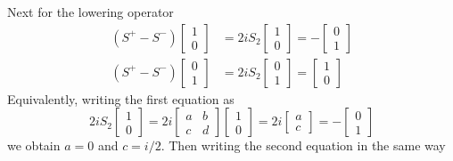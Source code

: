 \documentclass[../../../main.tex]{subfiles}
\begin{document}
Next for the lowering operator
\begin{align*}
    (S^+ - S^-) \begin{bmatrix}1 \\ 0 \end{bmatrix} & =  2i S_2 \begin{bmatrix}1 \\ 0 \end{bmatrix} = - \begin{bmatrix}0 \\ 1 \end{bmatrix} \\
    (S^+ - S^-) \begin{bmatrix}0 \\ 1 \end{bmatrix} & =  2i S_2 \begin{bmatrix}0 \\ 1 \end{bmatrix} = \begin{bmatrix}1 \\ 0 \end{bmatrix}
\end{align*}
Equivalently, writing the first equation as
\begin{equation*}
    2iS_2 \begin{bmatrix}
        1 \\
        0
    \end{bmatrix}  =
    2i
    \begin{bmatrix}
        a & b \\
        c & d
    \end{bmatrix}  \begin{bmatrix}
        1 \\
        0
    \end{bmatrix}  =
    2i
    \begin{bmatrix}
        a \\
        c
    \end{bmatrix}
    =
    -
    \begin{bmatrix}
        0 \\
        1
    \end{bmatrix}
\end{equation*}
we obtain $a=0$ and $c=i/2$.
Then writing the second equation in the same way
\end{document}
